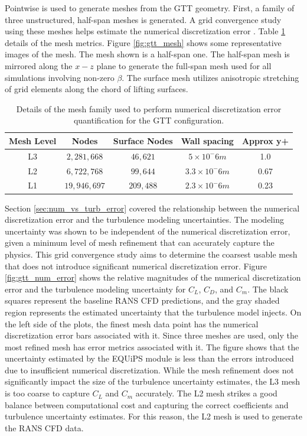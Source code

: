 Pointwise is used to generate meshes from the GTT geometry. 
First, a family of three unstructured, half-span meshes is generated.
A grid convergence study using these meshes helps estimate the numerical discretization error \cite{american_society_of_mechanical_engineers_standard_2009}. 
Table \ref{tab:gtt_meshes} details of the mesh metrics.
Figure \ref{fig:gtt_mesh} shows some representative images of the mesh.
The mesh shown is a half-span one.
The half-span mesh is mirrored along the $x-z$ plane to generate the full-span mesh used for all simulations involving non-zero $\beta$.
The surface mesh utilizes anisotropic stretching of grid elements along the chord of lifting surfaces.

\begin{table}
    \renewcommand{\arraystretch}{1.2}
    \centering
    \begin{tabular}{ c|c|c|c|c } 
         Mesh Level & Nodes & Surface Nodes & Wall spacing & Approx y+  \\ 
         \hline
         L3 & $2,281,668$ & $46,621$ & $5\times10^-6 m$ & 1.0 \\
         L2 & $6,722,768$ & $99,644$ & $3.3\times10^-6 m$ & 0.67 \\
         L1 & $19,946,697$ & $209,488$ & $2.3\times10^-6 m$ & 0.23 \\
         
    \end{tabular}
    \caption{Details of the mesh family used to perform numerical discretization error quantification for the GTT configuration.}
    \label{tab:gtt_meshes}
\end{table}

Section \ref{sec:num_vs_turb_error} covered the relationship between the numerical discretization error and the turbulence modeling uncertainties. 
The modeling uncertainty was shown to be independent of the numerical discretization error, given a minimum level of mesh refinement that can accurately capture the physics. 
This grid convergence study aims to determine the coarsest usable mesh that does not introduce significant numerical discretization error.
Figure \ref{fig:gtt_num_error} shows the relative magnitudes of the numerical discretization error and the turbulence modeling uncertainty for $C_L$, $C_D$, and $C_m$.
The black squares represent the baseline RANS CFD predictions, and the gray shaded region represents the estimated uncertainty that the turbulence model injects. 
On the left side of the plots, the finest mesh data point has the numerical discretization error bars associated with it. 
Since three meshes are used, only the most refined mesh has error metrics associated with it. 
The figure shows that the uncertainty estimated by the EQUiPS module is less than the errors introduced due to insufficient numerical discretization.
While the mesh refinement does not significantly impact the size of the turbulence uncertainty estimates, the L3 mesh is too coarse to capture $C_L$ and $C_m$ accurately. 
The L2 mesh strikes a good balance between computational cost and capturing the correct coefficients and turbulence uncertainty estimates.  
For this reason, the L2 mesh is used to generate the RANS CFD data. 

